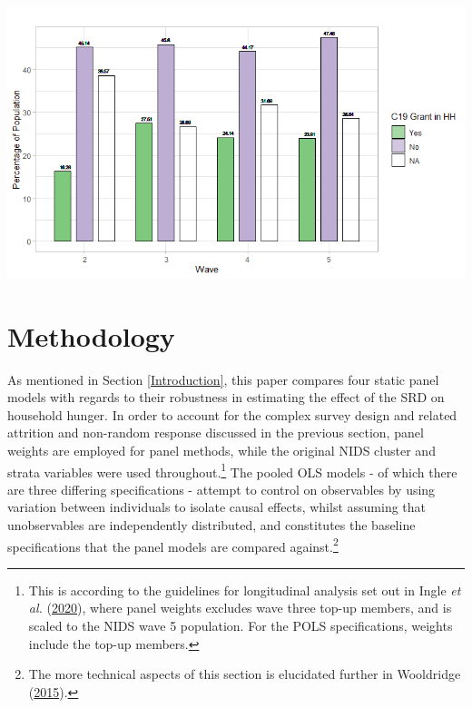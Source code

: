 \documentclass[11pt,preprint, authoryear]{elsarticle}
\let\origfigure\figure
\let\endorigfigure\endfigure
\renewenvironment{figure}[1][2] {
    \expandafter\origfigure\expandafter[H]
} {
    \endorigfigure
}
\numberwithin{equation}{section}
\numberwithin{figure}{section}
\numberwithin{table}{section}
\let\rmarkdownfootnote\footnote%
\def\footnote{\protect\rmarkdownfootnote}
\begin{document}
\begin{figure}[H]
\includegraphics[width=1\linewidth]{figures/c19_grant_descrip} \caption{\label{grant} Proportion of SRD Recipients}\label{fig:grant}
\end{figure}

\hypertarget{methodology}{%
\section{\texorpdfstring{Methodology
\label{Meth}}{Methodology }}\label{methodology}}

As mentioned in Section \ref{Introduction}, this paper compares four
static panel models with regards to their robustness in estimating the
effect of the SRD on household hunger. In order to account for the
complex survey design and related attrition and non-random response
discussed in the previous section, panel weights are employed for panel
methods, while the original NIDS cluster and strata variables were used
throughout.\footnote{This is according to the guidelines for
  longitudinal analysis set out in Ingle \emph{et al.}
  (\protect\hyperlink{ref-nids2020}{2020}), where panel weights excludes
  wave three top-up members, and is scaled to the NIDS wave 5
  population. For the POLS specifications, weights include the top-up
  members.} The pooled OLS models - of which there are three differing
specifications - attempt to control on observables by using variation
between individuals to isolate causal effects, whilst assuming that
unobservables are independently distributed, and constitutes the
baseline specifications that the panel models are compared
against.\footnote{The more technical aspects of this section is
  elucidated further in Wooldridge
  (\protect\hyperlink{ref-wooldridge}{2015}).}
\end{document}
